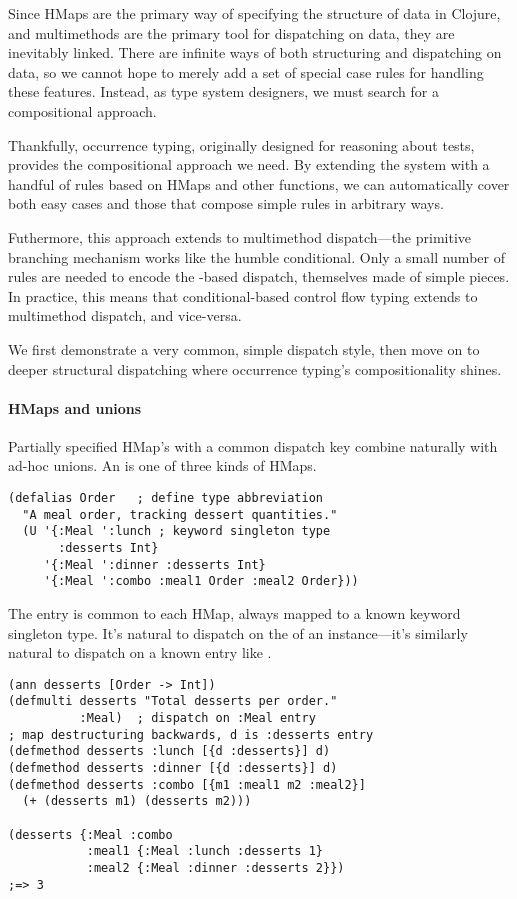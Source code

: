 Since HMaps are the primary way of specifying the structure of data in Clojure,
and multimethods are the primary tool for dispatching on data, they are inevitably
linked.
There are infinite ways of both structuring and dispatching on data,
so we cannot hope to merely add a set of special case rules for
handling these features. Instead, as type system designers, we must
search for a compositional approach.

Thankfully, occurrence typing, originally designed for reasoning about
 tests, provides the compositional approach we need.
By extending the system with
a handful of rules based on HMaps and other functions, 
we can automatically cover both easy cases and those
that compose simple rules in arbitrary ways.

Futhermore, this approach extends to multimethod dispatch---the primitive branching
mechanism works like the humble  conditional. 
Only a small number of rules are needed
to encode the -based dispatch, themselves made of simple pieces.
In practice, this means that conditional-based control flow typing
 extends to  multimethod dispatch, and vice-versa.

We first demonstrate a very common, simple dispatch style,
then move on to deeper structural dispatching where occurrence typing's
compositionality shines.

\paragraph{HMaps and unions} Partially specified HMap's with a common dispatch key
combine naturally with ad-hoc unions.
An  is one of three kinds of HMaps.

\begin{verbatim}
(defalias Order   ; define type abbreviation
  "A meal order, tracking dessert quantities."
  (U '{:Meal ':lunch ; keyword singleton type
       :desserts Int}
     '{:Meal ':dinner :desserts Int}
     '{:Meal ':combo :meal1 Order :meal2 Order}))
\end{verbatim}

The  entry is common to each HMap, always mapped to a known keyword singleton
type.
It's natural to dispatch on the  of an instance---it's similarly
natural to dispatch on a known entry like .

\begin{exmp}
\begin{verbatim}
(ann desserts [Order -> Int])
(defmulti desserts "Total desserts per order."
          :Meal)  ; dispatch on :Meal entry
; map destructuring backwards, d is :desserts entry
(defmethod desserts :lunch [{d :desserts}] d)
(defmethod desserts :dinner [{d :desserts}] d)
(defmethod desserts :combo [{m1 :meal1 m2 :meal2}]
  (+ (desserts m1) (desserts m2)))

(desserts {:Meal :combo 
           :meal1 {:Meal :lunch :desserts 1}
           :meal2 {:Meal :dinner :desserts 2}})
;=> 3
\end{verbatim}
\label{example:desserts-on-meal}
\end{exmp}

